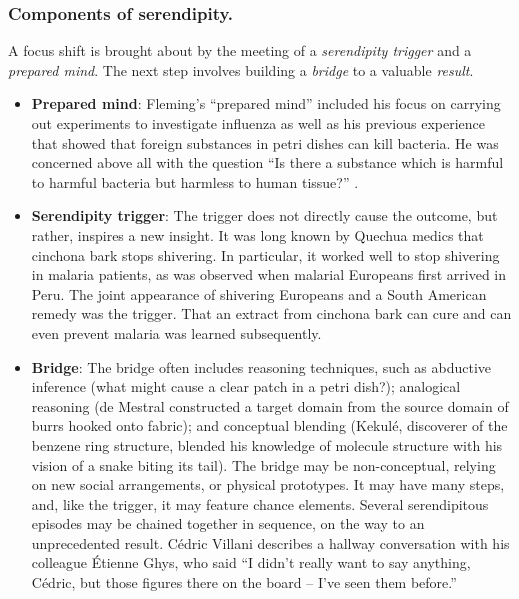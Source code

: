 \subsubsection{Components of serendipity.}

A focus shift is brought about by the meeting of a \emph{serendipity trigger} and a \emph{prepared mind}.  The next step involves building a \emph{bridge} to a valuable \emph{result}.

\begin{itemize}
\item \textbf{Prepared mind}: 
Fleming's ``prepared mind'' included his focus
on carrying out experiments to investigate influenza as well as his
previous experience that showed that foreign substances in petri dishes can kill
bacteria.  He was concerned above all with the question ``Is there a
substance which is harmful to harmful bacteria but harmless to human
tissue?''  \cite[p. 161]{roberts}.
\end{itemize}

\begin{itemize}
\item \textbf{Serendipity trigger}: The trigger does not directly
  cause the outcome, but rather, inspires a new insight.  It was long
  known by Quechua medics that cinchona bark stops shivering.  In
  particular, it worked well to stop shivering in malaria patients, as
  was observed when malarial Europeans first arrived in Peru.  The
  joint appearance of shivering Europeans and a South American remedy
  was the trigger.  That an extract from cinchona bark can cure and
  can even prevent malaria was learned subsequently.
\end{itemize}

\begin{itemize}
\item \textbf{Bridge}: The bridge often includes reasoning techniques,
  such as abductive inference (what might cause a clear patch in a
  petri dish?); analogical reasoning (de Mestral constructed a target
  domain from the source domain of burrs hooked onto fabric); and
  conceptual blending (Kekul\'e, discoverer of the benzene ring
  structure, blended his knowledge of molecule structure with his
  vision of a snake biting its tail).  The bridge may be
  non-conceptual, relying on new social arrangements, or physical
  prototypes.  It may have many steps, and, like the trigger, it may
  feature chance elements.  Several serendipitous episodes may be
  chained together in sequence, on the way to an unprecedented result.
  C\'edric Villani \citeyear[p.~16]{birth-of-a-theorem} describes a hallway
  conversation with his colleague \'Etienne Ghys, who said ``I didn't
  really want to say anything, C\'edric, but those figures there on
  the board -- I've seen them before.''
\end{itemize}

